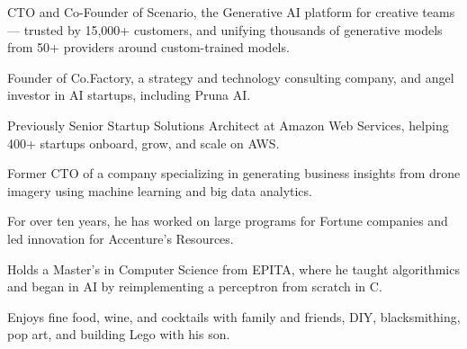 
\begin{cvparagraph}

CTO and Co-Founder of Scenario, the Generative AI platform for creative teams --- trusted by 15,000+ customers, and unifying thousands of generative models from 50+ providers around custom-trained models.

Founder of Co.Factory, a strategy and technology consulting company, and angel investor in AI startups, including Pruna AI.

Previously Senior Startup Solutions Architect at Amazon Web Services, helping 400+ startups onboard, grow, and scale on AWS.

Former CTO of a company specializing in generating business insights from drone imagery using machine learning and big data analytics.

For over ten years, he has worked on large programs for Fortune companies and led innovation for Accenture’s Resources.

Holds a Master’s in Computer Science from EPITA, where he taught algorithmics and began in AI by reimplementing a perceptron from scratch in C.

Enjoys fine food, wine, and cocktails with family and friends, DIY, blacksmithing, pop art, and building Lego with his son.
\end{cvparagraph}
